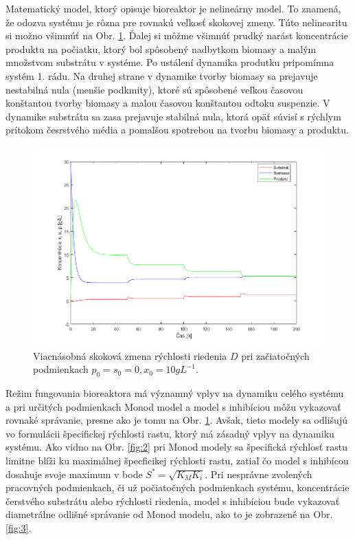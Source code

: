 Matematický model, ktorý opisuje bioreaktor je nelineárny model. To znamená, že odozva systému je rôzna pre rovnakú veľkosť skokovej zmeny. Túto nelinearitu si možno všimnúť na Obr. \ref{fig:1}. Ďalej si môžme všimnúť prudký narást koncentrácie produktu na počiatku, ktorý bol spôsobený nadbytkom biomasy a malým množstvom substrátu v systéme. Po ustálení dynamika produtku pripomímna systém 1. rádu. Na druhej strane v dynamike tvorby biomasy sa prejavuje nestabilná nula (menšie podkmity), ktoré sú spôsobené veľkou časovou konštantou tvorby biomasy a malou časovou konštantou odtoku suspenzie. V dynamike substrátu sa zasa prejavuje stabilná nula, ktorá opäť súvisí s rýchlym prítokom česrstvého média a pomalšou spotrebou na tvorbu biomasy a produktu.

\begin{figure}
	\centering
	\includegraphics[width=.7\linewidth]{images/step_change}
	\caption[]{Viacnásobná skoková zmena rýchlosti riedenia $D$ pri začiatočných podmienkach $p_0 = s_0 = 0, x_0 = 10 gL^{-1}$.}
	\label{fig:1}
\end{figure}

Režim fungovania bioreaktora má významný vplyv na dynamiku celého systému a pri určitých podmienkach Monod model a model s inhibíciou môžu vykazovať rovnaké správanie, presne ako je tomu na Obr. \ref{fig:1}. Avšak, tieto modely sa odlišujú vo formulácii špecifickej rýchlosti rastu, ktorý má zásadný vplyv na dynamiku systému. Ako vidno na Obr. \ref{fig:2} pri Monod modely sa špecifická rýchlosť rastu limitne blíži ku maximálnej špecficikej rýchlosti rastu, zatiaľ čo model s inhibícou dosahuje svoje maximum v bode $S^{*} = \sqrt{K_M K_i}$. Pri nesprávne zvolených pracovných podmienkach, či už počiatočných podmienkach systému, koncentrácie čerstvého substrátu alebo rýchlosti riedenia, model s inhibíciou bude vykazovať diametrálne odlišné správanie od Monod modelu, ako to je zobrazené na Obr. \ref{fig:3}.

